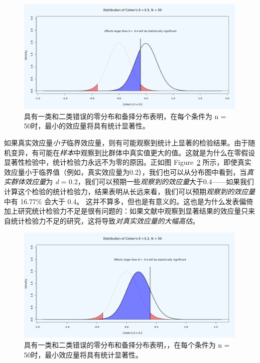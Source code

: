 \documentclass[
  letterpaper,
  DIV=11,
  numbers=noendperiod]{scrreprt}
\begin{document}
\begin{figure}

{\centering \includegraphics[width=1\textwidth,height=\textheight]{images/dpplot50.png}

}

\caption{\label{fig-distpowerplot1}具有一类和二类错误的零分布和备择分布表明，在每个条件为
n = 50时，最小的效应量将具有统计显著性。}

\end{figure}

如果真实效应量\emph{小于}临界效应量，则有可能观察到统计上显著的检验结果。由于随机变异，有可能在\emph{样本}中观察到比群体中真实值更大的值。这就是为什么在零假设显著性检验中，统计检验力永远不为零的原因。正如图
Figure~\ref{fig-distpowerplot2}
所示，即使真实效应量小于临界值（例如，真实效应量为0.2），我们也可以从分布图中看到，当\emph{真实群体效应量}为
\emph{d} =
0.2，我们可以预期一些\emph{观察到的效应量}大于0.4------如果我们计算这个检验的统计检验力，结果表明从长远来看，我们可以预期\emph{观察到的效应量}中有
16.77\% 会大于 0.4。
这并不算多，但也是有意义的。这也是为什么发表偏倚加上研究统计检验力不足是很有问题的：如果文献中观察到显著结果的效应量只来自统计检验力不足的研究，这将导致\emph{对真实效应量的大幅高估}。

\begin{figure}

{\centering \includegraphics[width=1\textwidth,height=\textheight]{images/dpplot502.png}

}

\caption{\label{fig-distpowerplot2}具有一类和二类错误的零分布和备择分布表明，，在每个条件为
n = 50时，最小效应量将具有统计显著性。}

\end{figure}
\end{document}
